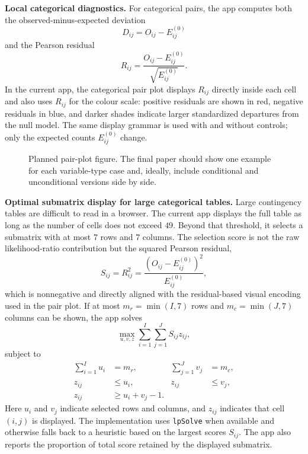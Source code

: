 \documentclass[preprint,12pt,a4paper]{elsarticle}
\numberwithin{equation}{section}
\begin{document}
\textbf{Local categorical diagnostics.} For categorical pairs, the app computes both the observed-minus-expected deviation
\begin{equation}
D_{ij}=O_{ij}-E^{(0)}_{ij}
\label{eq:dij-main}
\end{equation}
and the Pearson residual
\begin{equation}
R_{ij}=\frac{O_{ij}-E^{(0)}_{ij}}{\sqrt{E^{(0)}_{ij}}}.
\label{eq:rij-main}
\end{equation}
In the current app, the categorical pair plot displays $R_{ij}$ directly inside each cell and also uses $R_{ij}$ for the colour scale: positive residuals are shown in red, negative residuals in blue, and darker shades indicate larger standardized departures from the null model. The same display grammar is used with and without controls; only the expected counts $E^{(0)}_{ij}$ change.

\begin{figure}[!ht]
\centering
{}
\caption{Planned pair-plot figure. The final paper should show one example for each variable-type case and, ideally, include conditional and unconditional versions side by side.}
\label{fig:pairplots}
\end{figure}

\textbf{Optimal submatrix display for large categorical tables.} Large contingency tables are difficult to read in a browser. The current app displays the full table as long as the number of cells does not exceed $49$. Beyond that threshold, it selects a submatrix with at most $7$ rows and $7$ columns. The selection score is not the raw likelihood-ratio contribution but the squared Pearson residual,
\begin{equation}
S_{ij}=R_{ij}^2=\frac{\left(O_{ij}-E^{(0)}_{ij}\right)^2}{E^{(0)}_{ij}},
\label{eq:score-main}
\end{equation}
which is nonnegative and directly aligned with the residual-based visual encoding used in the pair plot. If at most $m_r=\min(I,7)$ rows and $m_c=\min(J,7)$ columns can be shown, the app solves
\begin{equation}
\max_{u,v,z}\sum_{i=1}^{I}\sum_{j=1}^{J} S_{ij}z_{ij},
\label{eq:sub-obj-main}
\end{equation}
subject to
\begin{align}
\sum_{i=1}^{I}u_i &= m_r,
&
\sum_{j=1}^{J}v_j &= m_c,
\label{eq:sub-cons-main-a}
\\
z_{ij} &\le u_i,
&
z_{ij} &\le v_j,
\label{eq:sub-cons-main-b}
\\
z_{ij} &\ge u_i+v_j-1.
\label{eq:sub-cons-main-c}
\end{align}
Here $u_i$ and $v_j$ indicate selected rows and columns, and $z_{ij}$ indicates that cell $(i,j)$ is displayed. The implementation uses \texttt{lpSolve} when available and otherwise falls back to a heuristic based on the largest scores $S_{ij}$. The app also reports the proportion of total score retained by the displayed submatrix.
\end{document}
